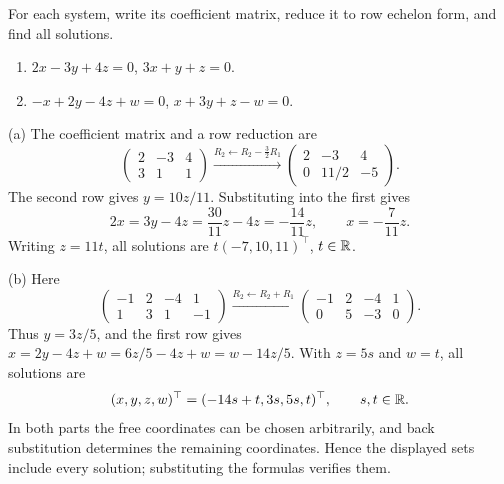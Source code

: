 \begin{problem}\label{ex:01:two-equations-three-unknowns}
For each system, write its coefficient matrix, reduce it to row echelon
form, and find all solutions.
\begin{enumerate}[label=(\alph*)]
\item $2x-3y+4z=0$, $3x+y+z=0$.
\item $-x+2y-4z+w=0$, $x+3y+z-w=0$.
\end{enumerate}
\end{problem}
\begin{solution}
(a) The coefficient matrix and a row reduction are
\[
\begin{pmatrix}2&-3&4\\3&1&1\end{pmatrix}
\xrightarrow{R_2\leftarrow R_2-\frac32R_1}
\begin{pmatrix}2&-3&4\\0&11/2&-5\end{pmatrix}.
\]
The second row gives $y=10z/11$. Substituting into the first gives
\[
2x=3y-4z=\frac{30}{11}z-4z=-\frac{14}{11}z,
\qquad x=-\frac7{11}z.
\]
Writing $z=11t$, all solutions are $t(-7,10,11)^\top$, $t\in\mathbb R$.

(b) Here
\[
\begin{pmatrix}-1&2&-4&1\\1&3&1&-1\end{pmatrix}
\xrightarrow{R_2\leftarrow R_2+R_1}
\begin{pmatrix}-1&2&-4&1\\0&5&-3&0\end{pmatrix}.
\]
Thus $y=3z/5$, and the first row gives
$x=2y-4z+w=6z/5-4z+w=w-14z/5$.
With $z=5s$ and $w=t$, all solutions are
\[
(x,y,z,w)^\top=(-14s+t,3s,5s,t)^\top,\qquad s,t\in\mathbb R.
\]
In both parts the free coordinates can be chosen arbitrarily, and back
substitution determines the remaining coordinates. Hence the displayed
sets include every solution; substituting the formulas verifies them.
\end{solution}

